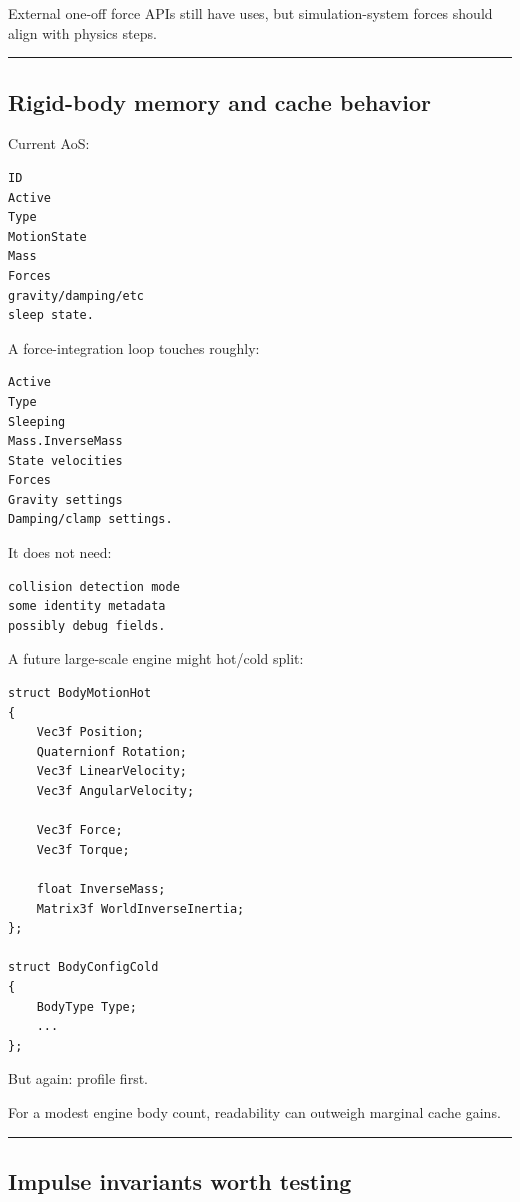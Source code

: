 External one-off force APIs still have uses, but simulation-system forces should align with physics steps.

\begin{center}\rule{0.5\linewidth}{0.5pt}\end{center}

\subsection{Rigid-body memory and cache behavior}\label{06-engine-ii-ch038-rigid-body-memory-and-cache-behavior}

Current AoS:

\begin{verbatim}
ID
Active
Type
MotionState
Mass
Forces
gravity/damping/etc
sleep state.
\end{verbatim}

A force-integration loop touches roughly:

\begin{verbatim}
Active
Type
Sleeping
Mass.InverseMass
State velocities
Forces
Gravity settings
Damping/clamp settings.
\end{verbatim}

It does not need:

\begin{verbatim}
collision detection mode
some identity metadata
possibly debug fields.
\end{verbatim}

A future large-scale engine might hot/cold split:

\begin{verbatim}
struct BodyMotionHot
{
    Vec3f Position;
    Quaternionf Rotation;
    Vec3f LinearVelocity;
    Vec3f AngularVelocity;

    Vec3f Force;
    Vec3f Torque;

    float InverseMass;
    Matrix3f WorldInverseInertia;
};

struct BodyConfigCold
{
    BodyType Type;
    ...
};
\end{verbatim}

But again: profile first.

For a modest engine body count, readability can outweigh marginal cache gains.

\begin{center}\rule{0.5\linewidth}{0.5pt}\end{center}

\subsection{Impulse invariants worth testing}\label{06-engine-ii-ch038-impulse-invariants-worth-testing}

